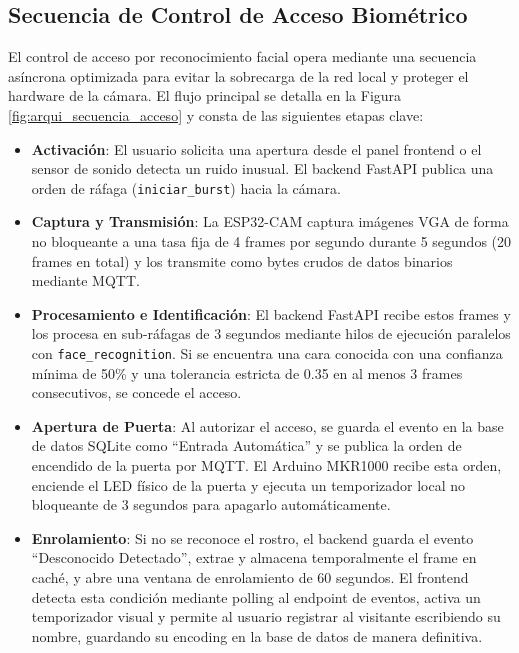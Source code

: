 \documentclass[12pt,letterpaper]{article}
\begin{document}
\subsection{Secuencia de Control de Acceso Biométrico}
El control de acceso por reconocimiento facial opera mediante una secuencia asíncrona optimizada para evitar la sobrecarga de la red local y proteger el hardware de la cámara. El flujo principal se detalla en la Figura \ref{fig:arqui_secuencia_acceso} y consta de las siguientes etapas clave:
\begin{itemize}
    \item \textbf{Activación}: El usuario solicita una apertura desde el panel frontend o el sensor de sonido detecta un ruido inusual. El backend FastAPI publica una orden de ráfaga (\texttt{iniciar\_burst}) hacia la cámara.
    \item \textbf{Captura y Transmisión}: La ESP32-CAM captura imágenes VGA de forma no bloqueante a una tasa fija de 4 frames por segundo durante 5 segundos (20 frames en total) y los transmite como bytes crudos de datos binarios mediante MQTT.
    \item \textbf{Procesamiento e Identificación}: El backend FastAPI recibe estos frames y los procesa en sub-ráfagas de 3 segundos mediante hilos de ejecución paralelos con \texttt{face\_recognition}. Si se encuentra una cara conocida con una confianza mínima de 50\% y una tolerancia estricta de 0.35 en al menos 3 frames consecutivos, se concede el acceso.
    \item \textbf{Apertura de Puerta}: Al autorizar el acceso, se guarda el evento en la base de datos SQLite como ``Entrada Automática'' y se publica la orden de encendido de la puerta por MQTT. El Arduino MKR1000 recibe esta orden, enciende el LED físico de la puerta y ejecuta un temporizador local no bloqueante de 3 segundos para apagarlo automáticamente.
    \item \textbf{Enrolamiento}: Si no se reconoce el rostro, el backend guarda el evento ``Desconocido Detectado'', extrae y almacena temporalmente el frame en caché, y abre una ventana de enrolamiento de 60 segundos. El frontend detecta esta condición mediante polling al endpoint de eventos, activa un temporizador visual y permite al usuario registrar al visitante escribiendo su nombre, guardando su encoding en la base de datos de manera definitiva.
\end{itemize}
\end{document}
